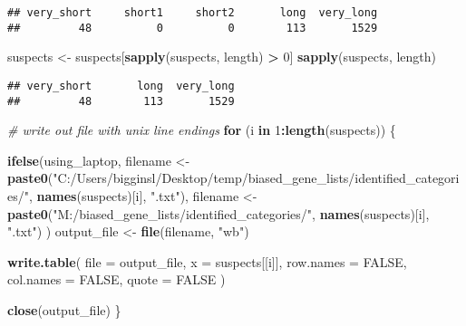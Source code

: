 \documentclass[]{article}
\newenvironment{Shaded}{\begin{snugshade}}{\end{snugshade}}
\newcommand{\KeywordTok}[1]{\textcolor[rgb]{0.13,0.29,0.53}{\textbf{#1}}}
\newcommand{\DataTypeTok}[1]{\textcolor[rgb]{0.13,0.29,0.53}{#1}}
\newcommand{\DecValTok}[1]{\textcolor[rgb]{0.00,0.00,0.81}{#1}}
\newcommand{\StringTok}[1]{\textcolor[rgb]{0.31,0.60,0.02}{#1}}
\newcommand{\CommentTok}[1]{\textcolor[rgb]{0.56,0.35,0.01}{\textit{#1}}}
\newcommand{\OtherTok}[1]{\textcolor[rgb]{0.56,0.35,0.01}{#1}}
\newcommand{\ControlFlowTok}[1]{\textcolor[rgb]{0.13,0.29,0.53}{\textbf{#1}}}
\newcommand{\OperatorTok}[1]{\textcolor[rgb]{0.81,0.36,0.00}{\textbf{#1}}}
\newcommand{\NormalTok}[1]{#1}
\begin{document}
\begin{verbatim}
## very_short     short1     short2       long  very_long 
##         48          0          0        113       1529
\end{verbatim}

\begin{Shaded}
\begin{Highlighting}[]
\NormalTok{suspects <-}\StringTok{ }\NormalTok{suspects[}\KeywordTok{sapply}\NormalTok{(suspects, length) }\OperatorTok{>}\StringTok{ }\DecValTok{0}\NormalTok{]}
\KeywordTok{sapply}\NormalTok{(suspects, length)}
\end{Highlighting}
\end{Shaded}

\begin{verbatim}
## very_short       long  very_long 
##         48        113       1529
\end{verbatim}

\begin{Shaded}
\begin{Highlighting}[]
\CommentTok{# write out file with unix line endings}
\ControlFlowTok{for}\NormalTok{ (i }\ControlFlowTok{in} \DecValTok{1}\OperatorTok{:}\KeywordTok{length}\NormalTok{(suspects)) \{}
  
  \KeywordTok{ifelse}\NormalTok{(using_laptop,}
\NormalTok{         filename <-}\StringTok{ }\KeywordTok{paste0}\NormalTok{(}\StringTok{"C:/Users/bigginsl/Desktop/temp/biased_gene_lists/identified_categories/"}\NormalTok{, }\KeywordTok{names}\NormalTok{(suspects)[i], }\StringTok{".txt"}\NormalTok{),}
\NormalTok{         filename <-}\StringTok{ }\KeywordTok{paste0}\NormalTok{(}\StringTok{"M:/biased_gene_lists/identified_categories/"}\NormalTok{, }\KeywordTok{names}\NormalTok{(suspects)[i], }\StringTok{".txt"}\NormalTok{)}
\NormalTok{  )}
\NormalTok{  output_file <-}\StringTok{ }\KeywordTok{file}\NormalTok{(filename, }\StringTok{"wb"}\NormalTok{)}
  
  \KeywordTok{write.table}\NormalTok{(}
    \DataTypeTok{file      =}\NormalTok{ output_file,}
    \DataTypeTok{x         =}\NormalTok{ suspects[[i]], }
    \DataTypeTok{row.names =} \OtherTok{FALSE}\NormalTok{,}
    \DataTypeTok{col.names =} \OtherTok{FALSE}\NormalTok{, }
    \DataTypeTok{quote     =} \OtherTok{FALSE}
\NormalTok{  )}
  
  \KeywordTok{close}\NormalTok{(output_file)}
\NormalTok{\}}
\end{Highlighting}
\end{Shaded}
\end{document}
